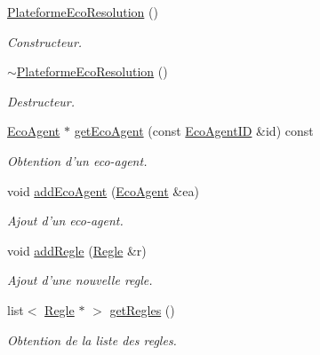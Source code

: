 \begin{CompactItemize}
\item 
\hyperlink{classPlateformeEcoResolution_6e03cc2c6a51bc4a47d2d226e41d13e9}{PlateformeEcoResolution} ()
\begin{CompactList}\small\item\em Constructeur. \item\end{CompactList}\item 
\hyperlink{classPlateformeEcoResolution_356b4862f53c4be870304e5186601b5a}{$\sim$PlateformeEcoResolution} ()
\begin{CompactList}\small\item\em Destructeur. \item\end{CompactList}\item 
\hyperlink{classEcoAgent}{EcoAgent} $\ast$ \hyperlink{classPlateformeEcoResolution_acd4e2899f178261ddd0fde086932e84}{getEcoAgent} (const \hyperlink{classEcoAgentID}{EcoAgentID} \&id) const 
\begin{CompactList}\small\item\em Obtention d'un eco-agent. \item\end{CompactList}\item 
void \hyperlink{classPlateformeEcoResolution_6fdb4c8ecc62252da4326d9763d4f28d}{addEcoAgent} (\hyperlink{classEcoAgent}{EcoAgent} \&ea)
\begin{CompactList}\small\item\em Ajout d'un eco-agent. \item\end{CompactList}\item 
void \hyperlink{classPlateformeEcoResolution_c2978a0e31b186415ca156a19ac8a1dc}{addRegle} (\hyperlink{classRegle}{Regle} \&r)
\begin{CompactList}\small\item\em Ajout d'une nouvelle regle. \item\end{CompactList}\item 
list$<$ \hyperlink{classRegle}{Regle} $\ast$ $>$ \hyperlink{classPlateformeEcoResolution_81dad57670e80ac2d29d02918b610636}{getRegles} ()
\begin{CompactList}\small\item\em Obtention de la liste des regles. \item\end{CompactList}\item 

\end{CompactItemize}
